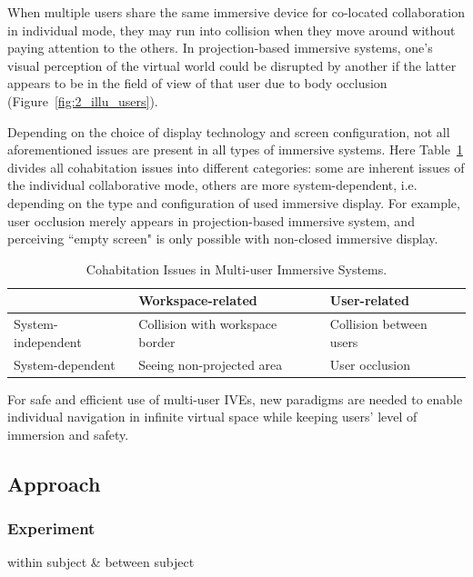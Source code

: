 When multiple users share the same immersive device for co-located collaboration in individual mode, they may run into collision when they move around without paying attention to the others. In projection-based immersive systems, one's visual perception of the virtual world could be disrupted by another if the latter appears to be in the field of view of that user due to body occlusion (Figure~\ref{fig:2_illu_users}).

Depending on the choice of display technology and screen configuration, not all aforementioned issues are present in all types of immersive systems. Here Table~\ref{tab:cohab_issues} divides all cohabitation issues into different categories: some are inherent issues of the individual collaborative mode, others are more system-dependent, i.e. depending on the type and configuration of used immersive display. For example, user occlusion merely appears in projection-based immersive system, and perceiving ``empty screen" is only possible with non-closed immersive display. 

\begin{table}[htb]
\renewcommand{\arraystretch}{1.3}
\caption{Cohabitation Issues in Multi-user Immersive Systems.}
\label{tab:cohab_issues}
\centering
\begin{tabular}{l | l l}
   & Workspace-related & User-related \\ \hline
  System-independent & Collision with workspace border & Collision between users \\
  System-dependent & Seeing non-projected area & User occlusion \\
\end{tabular}
\end{table}

For safe and efficient use of multi-user IVEs, new paradigms are needed to enable individual navigation in infinite virtual space while keeping users' level of immersion and safety.



\subsection{Approach}
\subsubsection{Experiment}
within subject \& between subject

